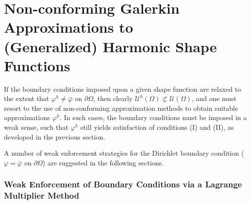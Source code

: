 \section*{Non-conforming Galerkin Approximations to \\ (Generalized) Harmonic Shape Functions} \label{sec:nonconforming}

	If the boundary conditions imposed upon a given shape function are relaxed to the extent that $\varphi^h \neq \bar{\varphi}$ on $\partial \Omega$, then clearly $\mathcal{U}^h (\Omega) \not\subset \mathcal{U} (\Omega)$, and one must resort to the use of non-conforming approximation methods to obtain suitable approximations $\varphi^h$. In such cases, the boundary conditions must be imposed in a weak sense, such that $\varphi^h$ still yields satisfaction of conditions (I) and (II), as developed in the previous section.
	
	A number of weak enforcement strategies for the Dirichlet boundary condition ($\varphi = \bar{\varphi}$ on $\partial \Omega$) are suggested in the following sections.
	
	\subsubsection*{Weak Enforcement of Boundary Conditions via a Lagrange Multiplier Method}
	

